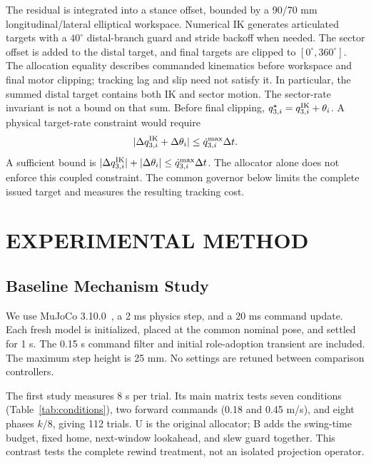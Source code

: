 \documentclass[letterpaper,10pt,conference]{ieeeconf}
\begin{document}
The residual is integrated into a stance offset, bounded by a 90/70 mm longitudinal/lateral elliptical workspace. Numerical IK generates articulated targets with a $40^\circ$ distal-branch guard and stride backoff when needed. The sector offset is added to the distal target, and final targets are clipped to $[0^\circ,360^\circ]$. The allocation equality describes commanded kinematics before workspace and final motor clipping; tracking lag and slip need not satisfy it. In particular, the summed distal target contains both IK and sector motion. The sector-rate invariant is not a bound on that sum. Before final clipping, $q^\star_{3,i}=q^{\rm IK}_{3,i}+\theta_i$. A physical target-rate constraint would require
\begin{equation}
 |\Delta q^{\rm IK}_{3,i}+\Delta\theta_i|\le\dot q_{3,i}^{\max}\Delta t.\label{eq:joint}
\end{equation}
A sufficient bound is $|\Delta q^{\rm IK}_{3,i}|+|\Delta\theta_i|\le\dot q_{3,i}^{\max}\Delta t$. The allocator alone does not enforce this coupled constraint. The common governor below limits the complete issued target and measures the resulting tracking cost.





\section{EXPERIMENTAL METHOD}
\subsection{Baseline Mechanism Study}
We use MuJoCo 3.10.0~\cite{todorov2012mujoco}, a 2 ms physics step, and a 20 ms command update. Each fresh model is initialized, placed at the common nominal pose, and settled for 1 s. The 0.15 s command filter and initial role-adoption transient are included. The maximum step height is 25 mm. No settings are retuned between comparison controllers.

The first study measures 8 s per trial. Its main matrix tests seven conditions (Table~\ref{tab:conditions}), two forward commands (0.18 and 0.45 m/s), and eight phases $k/8$, giving 112 trials. U is the original allocator; B adds the swing-time budget, fixed home, next-window lookahead, and slew guard together. This contrast tests the complete rewind treatment, not an isolated projection operator.
\end{document}
